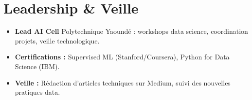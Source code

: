 \documentclass[a4paper,11pt]{article}
\begin{document}
\section{Leadership \& Veille}
\begin{itemize}[leftmargin=*, label=\tiny$\bullet$, nosep]
    \item \small{\textbf{Lead AI Cell} Polytechnique Yaoundé : workshops data science, coordination projets, veille technologique.}
    \item \small{\textbf{Certifications :} Supervised ML (Stanford/Coursera), Python for Data Science (IBM).}
    \item \small{\textbf{Veille :} Rédaction d'articles techniques sur Medium, suivi des nouvelles pratiques data.}
\end{itemize}
\end{document}
